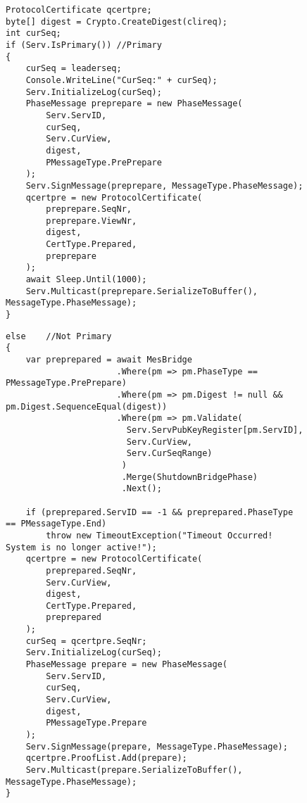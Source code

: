 \begin{figure}[H]
	\centering
	\begin{lstlisting}[label = code:Pre-PreparePrimary, caption= Source code for pre-prepare phase for primary replica, captionpos = b, basicstyle=\scriptsize]
ProtocolCertificate qcertpre;
byte[] digest = Crypto.CreateDigest(clireq);
int curSeq; 
if (Serv.IsPrimary()) //Primary
{
    curSeq = leaderseq;
    Console.WriteLine("CurSeq:" + curSeq);
    Serv.InitializeLog(curSeq);
    PhaseMessage preprepare = new PhaseMessage(
        Serv.ServID, 
    	curSeq, 
        Serv.CurView, 
        digest, 
        PMessageType.PrePrepare
    );
    Serv.SignMessage(preprepare, MessageType.PhaseMessage);
    qcertpre = new ProtocolCertificate(
        preprepare.SeqNr, 
        preprepare.ViewNr, 
        digest, 
        CertType.Prepared, 
        preprepare
    );
    await Sleep.Until(1000);
    Serv.Multicast(preprepare.SerializeToBuffer(), MessageType.PhaseMessage);
}
	\end{lstlisting}
\end{figure}

\begin{figure}[H]
	\centering
	\begin{lstlisting}[label = code:Pre-PrepareNonPrimary, caption= Pre-prepare phase for non-primary replica, captionpos = b, basicstyle=\scriptsize]
else	//Not Primary
{ 
    var preprepared = await MesBridge
    	              .Where(pm => pm.PhaseType == PMessageType.PrePrepare)
                      .Where(pm => pm.Digest != null && pm.Digest.SequenceEqual(digest))
                      .Where(pm => pm.Validate(
                        Serv.ServPubKeyRegister[pm.ServID],
                        Serv.CurView, 
                        Serv.CurSeqRange)
                       )
                       .Merge(ShutdownBridgePhase)
                       .Next();
                
    if (preprepared.ServID == -1 && preprepared.PhaseType == PMessageType.End) 
        throw new TimeoutException("Timeout Occurred! System is no longer active!");
    qcertpre = new ProtocolCertificate(
        preprepared.SeqNr, 
        Serv.CurView, 
        digest, 
        CertType.Prepared, 
        preprepared
    );
    curSeq = qcertpre.SeqNr; 
    Serv.InitializeLog(curSeq);
    PhaseMessage prepare = new PhaseMessage(
        Serv.ServID, 
        curSeq, 
        Serv.CurView, 
        digest, 
        PMessageType.Prepare
    );
    Serv.SignMessage(prepare, MessageType.PhaseMessage);
    qcertpre.ProofList.Add(prepare);
    Serv.Multicast(prepare.SerializeToBuffer(), MessageType.PhaseMessage);
}
	\end{lstlisting}
\end{figure}		

